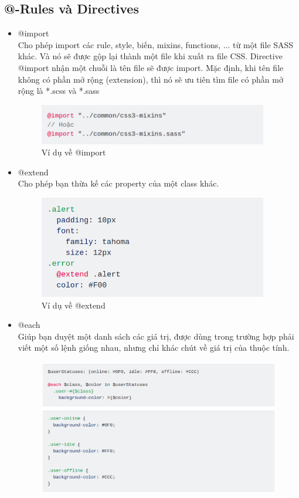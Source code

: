 \subsection{@-Rules và Directives}
    \begin{itemize}
        \item @import\\
        Cho phép import các rule, style, biến, mixins, functions, ... từ một file SASS khác. Và nó sẽ được gộp lại thành một file khi xuất ra file CSS. Directive @import nhận một chuỗi là tên file sẽ được import. Mặc định, khi tên file không có phần mở rộng (extension), thì nó sẽ ưu tiên tìm file có phần mở rộng là *.scss và *.sass
        \begin{figure}[H]
            \centering
            \includegraphics[width = 10cm]{image/sass-import.png}
            \caption{Ví dụ về @import}
            \label{fig:sass_import}
        \end{figure}
        \item @extend\\
        Cho phép bạn thừa kế các property của một class khác.
        \begin{figure}[H]
            \centering
            \includegraphics[width = 10cm]{image/sass-extend.png}
            \caption{Ví dụ về @extend}
            \label{fig:sass_extend}
        \end{figure}
        \item @each\\
        Giúp bạn duyệt một danh sách các giá trị, được dùng trong trường hợp phải viết một số lệnh giống nhau, nhưng chỉ khác chút về giá trị của thuộc tính.
        \begin{figure}[H]
            \centering
            \includegraphics[width = 0.9\linewidth]{image/sass-each.png}

\end{figure}
\end{itemize}
